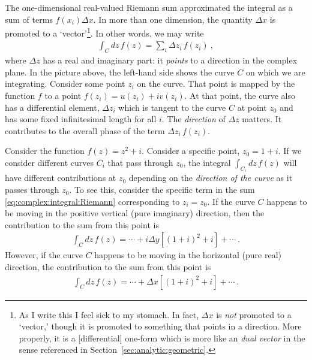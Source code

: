 The one-dimensional real-valued Riemann sum approximated the integral as a sum of terms $f(x_i)\Delta x$. In more than one dimension, the quantity $\Delta x$ is promoted to a `vector'\footnote{As I write this I feel sick to my stomach. In fact, $\Delta x$ is \emph{not} promoted to a `vector,' though it is promoted to something that points in a direction. More properly, it is a [differential] one-form which is more like an \emph{dual vector} in the sense referenced in Section~\ref{sec:analytic:geometric}.}. In other words, we may write
\begin{align}
  \int_C dz\, f(z) = \sum_i \Delta z_i \, f(z_i) \ ,
  \label{eq:complex:integral:Riemann}
\end{align}
where $\Delta z$ has a real and imaginary part: it \emph{points} to a direction in the complex plane. In the picture above, the left-hand side shows the curve $C$ on which we are integrating. Consider some point $z_i$ on the curve. That point is mapped by the function $f$ to a point $f(z_i) = u(z_i)+iv(z_i)$. At that point, the curve also has a differential element, $\Delta z_i$ which is tangent to the curve $C$ at point $z_0$ and has some fixed infinitesimal length for all $i$. The \emph{direction} of $\Delta z$ matters. It contributes to the overall phase of the term $\Delta z_i \, f(z_i)$.
\begin{example}
Consider the function $f(z) = z^2+i$.  Consider a specific point, $z_0 = 1+i$. If we consider different curves $C_i$ that pass through $z_0$, the integral $\int_{C_i}dz\,f(z)$ will have different contributions at $z_0$ depending on the \emph{direction of the curve} as it passes through $z_0$. To see this, consider the specific term in the sum \eqref{eq:complex:integral:Riemann} corresponding to $z_i = z_0$. If the curve $C$ happens to be moving in the positive vertical (pure imaginary) direction, then the contribution to the sum from this point is
\begin{align}
  \int_C dz\, f(z) = \cdots + i\Delta y\left[(1+i)^2 + i\right] + \cdots \ .
\end{align}
However, if the curve $C$ happens to be moving in the horizontal (pure real) direction, the contribution to the sum from this point is
\begin{align}
  \int_C dz\, f(z) = \cdots + \Delta x\left[(1+i)^2 + i\right] + \cdots \ .
\end{align}
\end{example}
